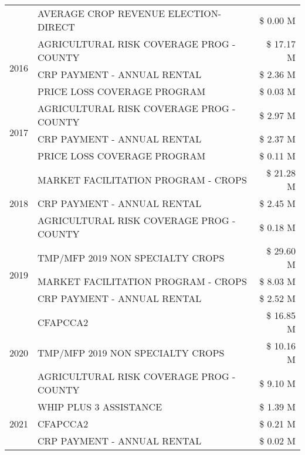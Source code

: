\begin{tabular}{llr}
 & AVERAGE CROP REVENUE ELECTION-DIRECT & \$ 0.00 M \\
\cline{1-3}
\multirow[t]{3}{*}{2016} & AGRICULTURAL RISK COVERAGE PROG - COUNTY      & \$ 17.17 M \\
 & CRP PAYMENT - ANNUAL RENTAL                   & \$ 2.36 M \\
 & PRICE LOSS COVERAGE PROGRAM                   & \$ 0.03 M \\
\cline{1-3}
\multirow[t]{3}{*}{2017} & AGRICULTURAL RISK COVERAGE PROG - COUNTY & \$ 2.97 M \\
 & CRP PAYMENT - ANNUAL RENTAL & \$ 2.37 M \\
 & PRICE LOSS COVERAGE PROGRAM & \$ 0.11 M \\
\cline{1-3}
\multirow[t]{3}{*}{2018} & MARKET FACILITATION PROGRAM - CROPS & \$ 21.28 M \\
 & CRP PAYMENT - ANNUAL RENTAL & \$ 2.45 M \\
 & AGRICULTURAL RISK COVERAGE PROG - COUNTY & \$ 0.18 M \\
\cline{1-3}
\multirow[t]{3}{*}{2019} & TMP/MFP 2019 NON SPECIALTY CROPS & \$ 29.60 M \\
 & MARKET FACILITATION PROGRAM - CROPS & \$ 8.03 M \\
 & CRP PAYMENT - ANNUAL RENTAL & \$ 2.52 M \\
\cline{1-3}
\multirow[t]{3}{*}{2020} & CFAPCCA2 & \$ 16.85 M \\
 & TMP/MFP 2019 NON SPECIALTY CROPS & \$ 10.16 M \\
 & AGRICULTURAL RISK COVERAGE PROG - COUNTY & \$ 9.10 M \\
\cline{1-3}
\multirow[t]{3}{*}{2021} & WHIP PLUS 3 ASSISTANCE & \$ 1.39 M \\
 & CFAPCCA2 & \$ 0.21 M \\
 & CRP PAYMENT - ANNUAL RENTAL & \$ 0.02 M \\
\cline{1-3}
\bottomrule
\end{tabular}
